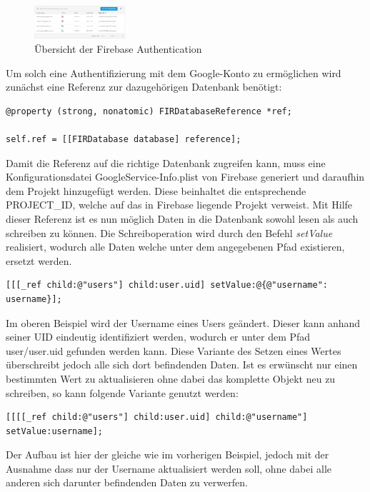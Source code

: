 \begin{figure}[ht]
  \centering
    \includegraphics[width=0.3\textwidth]{images/firebase_auth}
    \caption{Übersicht der Firebase Authentication}
	 \label{fig:firebase_auth}
\end{figure}

Um solch eine Authentifizierung mit dem Google-Konto zu ermöglichen wird zunächst eine Referenz zur dazugehörigen Datenbank benötigt:

\begin{lstlisting}
@property (strong, nonatomic) FIRDatabaseReference *ref;

self.ref = [[FIRDatabase database] reference];
\end{lstlisting}

Damit die Referenz auf die richtige Datenbank zugreifen kann, muss eine Konfigurationsdatei GoogleService-Info.plist von Firebase generiert und daraufhin dem Projekt hinzugefügt werden. Diese beinhaltet die entsprechende PROJECT_ID, welche auf das in Firebase liegende Projekt verweist.
Mit Hilfe dieser Referenz ist es nun möglich Daten in die Datenbank sowohl lesen als auch schreiben zu können. Die Schreiboperation wird durch den Befehl \textit{setValue} realisiert, wodurch alle Daten welche unter dem angegebenen Pfad existieren, ersetzt werden. 

\begin{lstlisting}
[[[_ref child:@"users"] child:user.uid] setValue:@{@"username": username}];
\end{lstlisting}

Im oberen Beispiel wird der Username eines Users geändert. Dieser kann anhand seiner UID eindeutig identifiziert werden, wodurch er unter dem Pfad user/user.uid gefunden werden kann.
Diese Variante des Setzen eines Wertes überschreibt jedoch alle sich dort befindenden Daten. Ist es erwünscht nur einen bestimmten Wert zu aktualisieren ohne dabei das komplette Objekt neu zu schreiben, so kann folgende Variante genutzt werden:

\begin{lstlisting}
[[[[_ref child:@"users"] child:user.uid] child:@"username"] setValue:username];
\end{lstlisting}

Der Aufbau ist hier der gleiche wie im vorherigen Beispiel, jedoch mit der Ausnahme dass nur der Username aktualisiert werden soll, ohne dabei alle anderen sich darunter befindenden Daten zu verwerfen.

